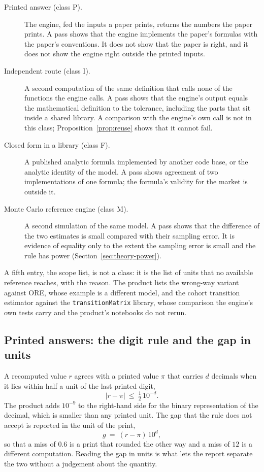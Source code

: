 \begin{description}
\item[Printed answer (class P).] The engine, fed the inputs a paper prints, returns the numbers the paper prints. A pass shows that the engine implements the paper's formulas with the paper's conventions. It does not show that the paper is right, and it does not show the engine right outside the printed inputs.
\item[Independent route (class I).] A second computation of the same definition that calls none of the functions the engine calls. A pass shows that the engine's output equals the mathematical definition to the tolerance, including the parts that sit inside a shared library. A comparison with the engine's own call is not in this class; Proposition~\ref{prop:reuse} shows that it cannot fail.
\item[Closed form in a library (class F).] A published analytic formula implemented by another code base, or the analytic identity of the model. A pass shows agreement of two implementations of one formula; the formula's validity for the market is outside it.
\item[Monte Carlo reference engine (class M).] A second simulation of the same model. A pass shows that the difference of the two estimates is small compared with their sampling error. It is evidence of equality only to the extent the sampling error is small and the rule has power (Section~\ref{sec:theory-power}).
\end{description}

A fifth entry, the scope list, is not a class: it is the list of units that no available reference reaches, with the reason. The product lists the wrong-way variant against ORE, whose example is a different model, and the cohort transition estimator against the \texttt{transitionMatrix} library, whose comparison the engine's own tests carry and the product's notebooks do not rerun.

\subsection{Printed answers: the digit rule and the gap in units}
\label{sec:proposed-printed}

A recomputed value $r$ agrees with a printed value $\pi$ that carries $d$ decimals when it lies within half a unit of the last printed digit,
\begin{equation}
\lvert r-\pi\rvert\ \le\ \tfrac12\,10^{-d}.
\label{eq:digit}
\end{equation}
The product adds $10^{-9}$ to the right-hand side for the binary representation of the decimal, which is smaller than any printed unit. The gap that the rule does not accept is reported in the unit of the print,
\begin{equation}
g\ =\ (r-\pi)\,10^{d},
\label{eq:unitgap}
\end{equation}
so that a miss of $0.6$ is a print that rounded the other way and a miss of $12$ is a different computation. Reading the gap in units is what lets the report separate the two without a judgement about the quantity.

